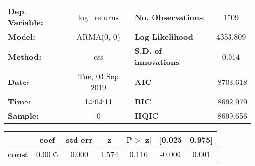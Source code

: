 \begin{center}
\begin{tabular}{lclc}
\toprule
\textbf{Dep. Variable:} &   log\_returns   & \textbf{  No. Observations:  } &    1509     \\
\textbf{Model:}         &    ARMA(0, 0)    & \textbf{  Log Likelihood     } &  4353.809   \\
\textbf{Method:}        &       css        & \textbf{  S.D. of innovations} &   0.014     \\
\textbf{Date:}          & Tue, 03 Sep 2019 & \textbf{  AIC                } & -8703.618   \\
\textbf{Time:}          &     14:04:11     & \textbf{  BIC                } & -8692.979   \\
\textbf{Sample:}        &        0         & \textbf{  HQIC               } & -8699.656   \\
\bottomrule
\end{tabular}
\begin{tabular}{lcccccc}
               & \textbf{coef} & \textbf{std err} & \textbf{z} & \textbf{P$> |$z$|$} & \textbf{[0.025} & \textbf{0.975]}  \\
\midrule
\textbf{const} &       0.0005  &        0.000     &     1.574  &         0.116        &       -0.000    &        0.001     \\
\bottomrule
\end{tabular}
\end{center}
